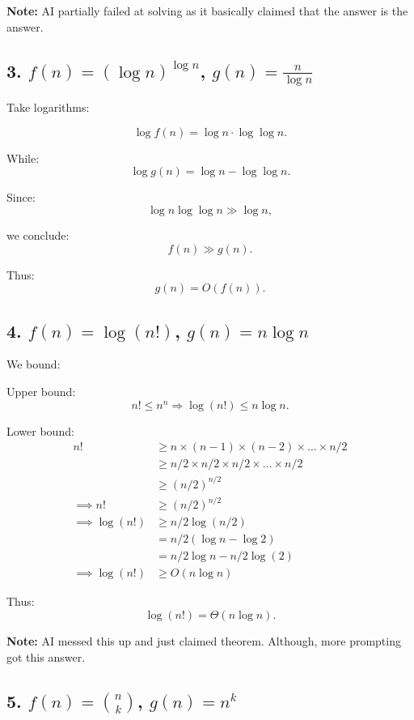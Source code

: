 \documentclass[11pt]{article}
\begin{document}
\textbf{Note:} AI partially failed at solving as it basically claimed that the answer is the answer.

\newpage

\subsection{3. $f(n)=(\log n)^{\log n}$, $g(n)=\frac{n}{\log n}$}

Take logarithms:

\[
\log f(n)=\log n \cdot \log\log n.
\]

While:
\[
\log g(n)=\log n - \log\log n.
\]

Since:
\[
\log n \log\log n \gg \log n,
\]

we conclude:
\[
f(n) \gg g(n).
\]

Thus:
\[
g(n)=O(f(n)).
\]

\newpage

\subsection{4. $f(n)=\log(n!)$, $g(n)=n\log n$}

We bound:

Upper bound:
\[
n! \le n^n
\Rightarrow \log(n!) \le n\log n.
\]

Lower bound:
\begin{align*}
n! &\ge n \times (n-1) \times (n-2) \times \dots \times n/2\\
&\ge n/2 \times n/2 \times n/2 \times \dots \times n/2 \\
&\ge (n/2)^{n/2}\\
\implies n! &\ge (n/2)^{n/2}\\
\implies \log(n!) &\ge n/2 \log(n/2)\\
&= n/2 (\log n - \log 2)\\
&= n/2 \log n - n/2 \log(2)\\
\implies \log(n!) &\ge O(n \log n)
\end{align*}

Thus:
\[
\log(n!) = \Theta(n\log n).
\]

\textbf{Note:} AI messed this up and just claimed theorem. Although, more prompting got this answer.

\newpage

\subsection{5. $f(n)=\binom{n}{k}$, $g(n)=n^k$}
\end{document}
